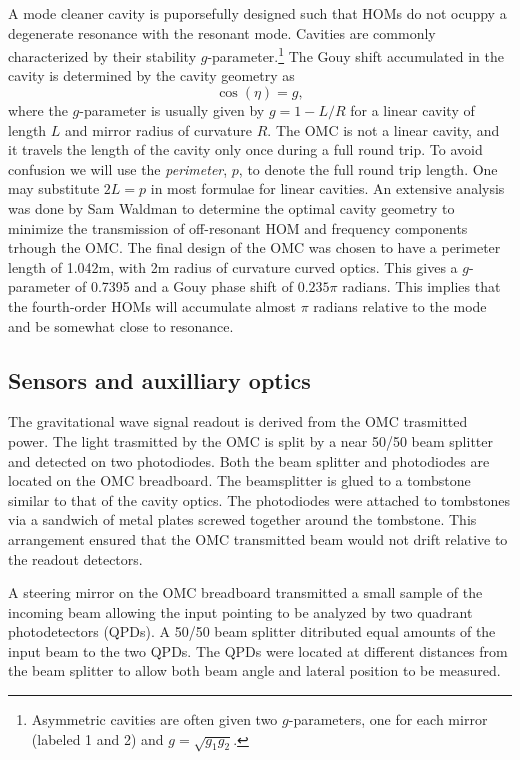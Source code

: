 A mode cleaner cavity is puporsefully designed such that HOMs do not ocuppy a degenerate resonance with the resonant  mode. %
Cavities are commonly characterized by their stability $g$-parameter.\footnote{Asymmetric cavities are often given two $g$-parameters, one for each mirror (labeled 1 and 2) and $g=\sqrt{g_1 g_2}$.} The Gouy shift accumulated in the cavity is determined by the cavity geometry as
\begin{equation}
\label{eqn:gouyg}
\cos(\eta)=g,
\end{equation}
where the $g$-parameter is usually given by $g=1-L/R$ for a linear cavity of length $L$ and mirror radius of curvature $R$.\cite{T080208} The OMC is not a linear cavity, and it travels the length of the cavity only once during a full round trip. %
To avoid confusion we will use the \emph{perimeter}, $p$, to denote the full round trip length. %
One may substitute $2L=p$ in most formulae for linear cavities. %
An extensive analysis was done by Sam Waldman to determine the optimal cavity geometry to minimize the transmission of off-resonant HOM and frequency components trhough the OMC.\cite{T080144} The final design of the OMC was chosen to have a perimeter length of 1.042m, with 2m radius of curvature curved optics. %
This gives a $g$-parameter of 0.7395 and a Gouy phase shift of $0.235\pi$ radians. %
This implies that the fourth-order HOMs will accumulate almost $\pi$ radians relative to the  mode and be somewhat close to resonance.

\subsection{Sensors and auxilliary optics}
The gravitational wave signal readout is derived from the OMC trasmitted power. %
The light trasmitted by the OMC is split by a near 50/50 beam splitter and detected on two photodiodes. %
Both the beam splitter and photodiodes are located on the OMC breadboard. %
The beamsplitter is glued to a tombstone similar to that of the cavity optics. %
The photodiodes were attached to tombstones via a sandwich of metal plates screwed together around the tombstone. %
This arrangement ensured that the OMC transmitted beam would not drift relative to the readout detectors.

A steering mirror on the OMC breadboard transmitted a small sample of the incoming beam allowing the input pointing to be analyzed by two quadrant photodetectors (QPDs). %
A 50/50 beam splitter ditributed equal amounts of the input beam to the two QPDs. %
The QPDs were located at different distances from the beam splitter to allow both beam angle and lateral position to be measured.

